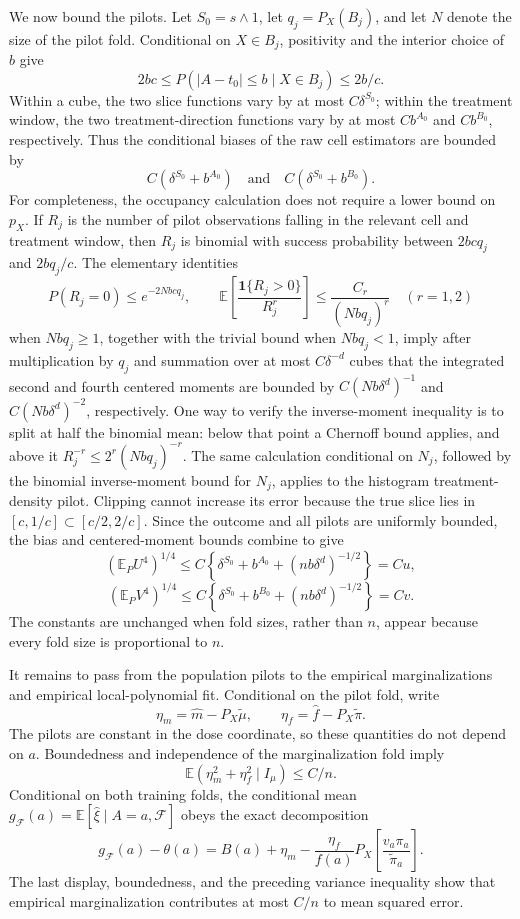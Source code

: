 We now bound the pilots. Let \(S_0=s\wedge1\), let \(q_j=P_X(B_j)\), and let \(N\) denote the size of the pilot fold. Conditional on \(X\in B_j\), positivity and the interior choice of \(b\) give
\[
2bc\le P(|A-t_0|\le b\mid X\in B_j)\le 2b/c.
\]
Within a cube, the two slice functions vary by at most \(C\delta^{S_0}\); within the treatment window, the two treatment-direction functions vary by at most \(Cb^{A_0}\) and \(Cb^{B_0}\), respectively. Thus the conditional biases of the raw cell estimators are bounded by
\[
C(\delta^{S_0}+b^{A_0})\quad\text{and}\quad C(\delta^{S_0}+b^{B_0}).
\]
For completeness, the occupancy calculation does not require a lower bound on \(p_X\). If \(R_j\) is the number of pilot observations falling in the relevant cell and treatment window, then \(R_j\) is binomial with success probability between \(2bcq_j\) and \(2bq_j/c\). The elementary identities
\[
P(R_j=0)\le e^{-2Nbcq_j},\qquad
\mathbb E\left[\frac{\mathbf1\{R_j>0\}}{R_j^r}\right]\le \frac{C_r}{(Nbq_j)^r}\quad(r=1,2)
\]
when \(Nbq_j\ge1\), together with the trivial bound when \(Nbq_j<1\), imply after multiplication by \(q_j\) and summation over at most \(C\delta^{-d}\) cubes that the integrated second and fourth centered moments are bounded by \(C(Nb\delta^d)^{-1}\) and \(C(Nb\delta^d)^{-2}\), respectively. One way to verify the inverse-moment inequality is to split at half the binomial mean: below that point a Chernoff bound applies, and above it \(R_j^{-r}\le 2^r(Nbq_j)^{-r}\). The same calculation conditional on \(N_j\), followed by the binomial inverse-moment bound for \(N_j\), applies to the histogram treatment-density pilot. Clipping cannot increase its error because the true slice lies in \([c,1/c]\subset[c/2,2/c]\). Since the outcome and all pilots are uniformly bounded, the bias and centered-moment bounds combine to give
\[
(\mathbb E_PU^4)^{1/4}\le C\left\{\delta^{S_0}+b^{A_0}+(nb\delta^d)^{-1/2}\right\}=Cu,
\]
\[
(\mathbb E_PV^4)^{1/4}\le C\left\{\delta^{S_0}+b^{B_0}+(nb\delta^d)^{-1/2}\right\}=Cv.
\]
The constants are unchanged when fold sizes, rather than \(n\), appear because every fold size is proportional to \(n\).

It remains to pass from the population pilots to the empirical marginalizations and empirical local-polynomial fit. Conditional on the pilot fold, write
\[
\eta_m=\widehat m-P_X\widetilde\mu,\qquad \eta_f=\widehat f-P_X\widetilde\pi.
\]
The pilots are constant in the dose coordinate, so these quantities do not depend on \(a\). Boundedness and independence of the marginalization fold imply
\[
\mathbb E(\eta_m^2+\eta_f^2\mid I_\mu)\le C/n.
\]
Conditional on both training folds, the conditional mean \(g_{\mathcal F}(a)=\mathbb E[\widehat\xi\mid A=a,\mathcal F]\) obeys the exact decomposition
\[
g_{\mathcal F}(a)-\theta(a)=B(a)+\eta_m-\frac{\eta_f}{f(a)}P_X\left[\frac{v_a\pi_a}{\widetilde\pi_a}\right].
\]
The last display, boundedness, and the preceding variance inequality show that empirical marginalization contributes at most \(C/n\) to mean squared error.

